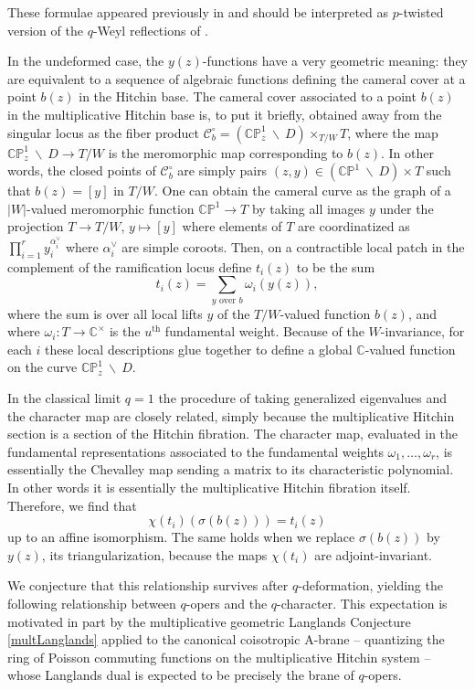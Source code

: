 \documentclass[11pt, oneside, reqno]{amsart}
\theoremstyle{definition} \newtheorem{definition}{Definition}[section]
\theoremstyle{definition} \newtheorem{remark}[definition]{Remark}
\theoremstyle{definition} \newtheorem{remarks}[definition]{Remarks}
\theoremstyle{definition} \newtheorem{question}[definition]{Question}
\theoremstyle{definition} \newtheorem*{note}{Note}
\theoremstyle{definition} \newtheorem{example}[definition]{Example}
\theoremstyle{definition} \newtheorem{examples}[definition]{Examples}
\newcommand{\bb}[1]{\mathbb{#1}}
\newcommand{\mc}[1]{\mathcal{#1}}
\newcommand{\bs}{\ \backslash \ }
\begin{document}
These formulae appeared previously in \cite{NekrasovPestun, NekrasovPestunShatashvili} and
should be interpreted as $p$-twisted version of the $q$-Weyl reflections of \cite{FrenkelReshetikhin2,FrenkelReshetikhinSTS,FrenkelReshetikhin1,Frenkel2001}.

In the undeformed case, the $y(z)$-functions have a very geometric meaning: they are equivalent to a sequence of algebraic functions defining the cameral cover at a point $b(z)$ in the Hitchin base.  The cameral cover associated to a point $b(z)$ in the multiplicative Hitchin base is, to put it briefly, obtained away from the singular locus as the fiber product $\mc C_b^\circ = (\bb{CP}^1_z \bs D) \times_{T/W} T$, where the map $\bb{CP}^1_z \bs D \to T/W$ is the meromorphic map corresponding to $b(z)$.  In other words, the closed points of $\mc C^\circ_b$ are simply pairs $(z, y) \in (\bb{CP}^1 \bs D) \times T$ such that $b(z) = [y]$ in $T/W$.  One can obtain the cameral curve as the graph of a $|W|$-valued
meromorphic function $\bb{CP}^1 \to T$ by
taking all images $y$ under the projection $T \to T/W$, $y \mapsto [y]$ where elements of $T$ are
coordinatized as  $\prod_{i = 1}^{r} y_i^{\alpha_i^{\vee}}$ where $\alpha_i^{\vee}$ are simple coroots.
Then, on a contractible local patch in the complement of the ramification locus define $t_i(z)$ to be the sum 
\[t_i(z) = \sum_{y \text{ over } b} \omega_i(y(z)),\]
where the sum is over all local lifts $y$ of the $T/W$-valued function $b(z)$, and where $\omega_i \colon T \to \mathbb{C}^{\times}$ is the $u^\text{th}$ fundamental weight. Because of the $W$-invariance, for each $i$ these local descriptions glue together to define a global $\mathbb{C}$-valued function on the curve $\bb{CP}^1_z \bs D$.

In the classical limit $q=1$ the procedure of taking generalized eigenvalues and the character map are closely related, simply because the multiplicative Hitchin section is a section of the Hitchin fibration.  The character map, evaluated in the fundamental representations associated to the fundamental weights $\omega_1, \ldots, \omega_r$, is essentially the Chevalley map sending a matrix to its characteristic polynomial.  In other words it is essentially the multiplicative Hitchin fibration itself.  Therefore, we find that 
\[\chi(t_i)(\sigma(b(z))) = t_i(z)\]
up to an affine isomorphism.  The same holds when we replace $\sigma(b(z))$ by $y(z)$, its triangularization, because the maps $\chi(t_i)$ are adjoint-invariant.

We conjecture that this relationship survives after $q$-deformation, yielding the following relationship between $q$-opers and the $q$-character.  This expectation is motivated in part by the multiplicative geometric Langlands Conjecture \ref{multLanglands} applied to the canonical coisotropic A-brane -- quantizing the ring of Poisson commuting functions on the multiplicative Hitchin system -- whose Langlands dual is expected to be precisely the brane of $q$-opers.
 
\end{document}
